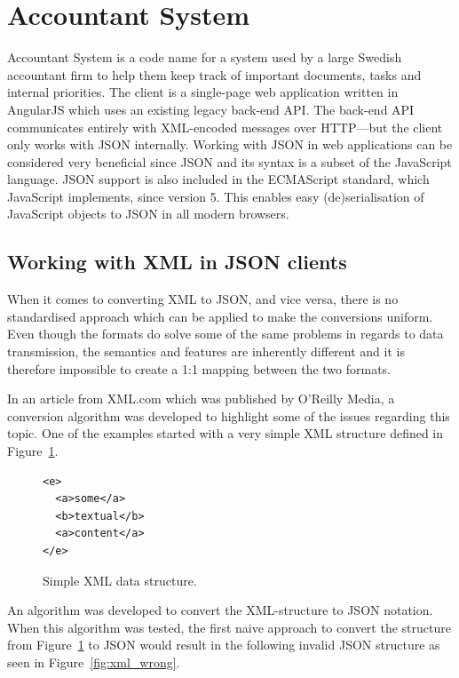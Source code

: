 \documentclass{cslthse-msc}
\begin{document}
\section{Accountant System}

Accountant System is a code name for a system used by a large Swedish accountant firm to help them keep track of important documents, tasks and internal priorities. The client is a single-page web application written in AngularJS which uses an existing legacy back-end API. The back-end API communicates entirely with XML-encoded messages over HTTP---but the client only works with JSON internally. Working with JSON in web applications can be considered very beneficial since JSON and its syntax is a subset of the JavaScript language. JSON support is also included in the ECMAScript standard, which JavaScript implements, since version 5\cite{ecmascript_5}. This enables easy (de)serialisation of JavaScript objects to JSON in all modern browsers.

\subsection{Working with XML in JSON clients}
\label{xml_json}

When it comes to converting XML to JSON, and vice versa, there is no standardised approach which can be applied to make the conversions uniform. Even though the formats do solve some of the same problems in regards to data transmission, the semantics and features are inherently different and it is therefore impossible to create a 1:1 mapping between the two formats.

In an article from XML.com\cite{xml_json} which was published by O'Reilly Media, a conversion algorithm was developed to highlight some of the issues regarding this topic. One of the examples started with a very simple XML structure defined in Figure~\ref{fig:xml_structure}.

\begin{figure}[H]
  \centering
    \begin{center}
\begin{lstlisting}[breaklines=true,frame=single]
<e>
  <a>some</a>
  <b>textual</b>
  <a>content</a>
</e>
\end{lstlisting}
    \end{center}
  \caption{Simple XML data structure.}
  \label{fig:xml_structure}
\end{figure}

An algorithm was developed to convert the XML-structure to JSON notation. When this algorithm was tested, the first naive approach to convert the structure from Figure~\ref{fig:xml_structure} to JSON would result in the following invalid JSON structure as seen in Figure~\ref{fig:xml_wrong}.
\end{document}
